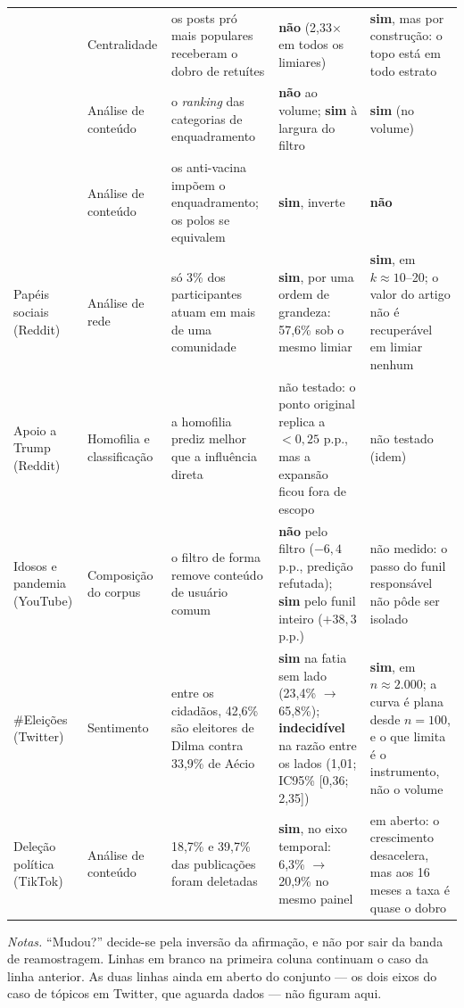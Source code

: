 \begin{table}[p]
\begin{tabularx}{\textwidth}{@{}>{\raggedright\arraybackslash}p{1.75cm}>{\raggedright\arraybackslash}p{2.15cm}X>{\raggedright\arraybackslash}p{2.7cm}>{\raggedright\arraybackslash}p{2.7cm}@{}}
 & Centralidade
 & os posts pró mais populares receberam o dobro de retuítes
 & \textbf{não} (2,33$\times$ em todos os limiares)
 & \textbf{sim}, mas por construção: o topo está em todo estrato \\
\addlinespace[2pt]
 & Análise de conteúdo
 & o \emph{ranking} das categorias de enquadramento
 & \textbf{não} ao volume; \textbf{sim} à largura do filtro
 & \textbf{sim} (no volume) \\
\addlinespace[2pt]
 & Análise de conteúdo
 & os anti-vacina impõem o enquadramento; os polos se equivalem
 & \textbf{sim}, inverte
 & \textbf{não} \\
\midrule
Papéis sociais (Reddit)
 & Análise de rede
 & só 3\% dos participantes atuam em mais de uma comunidade
 & \textbf{sim}, por uma ordem de grandeza: 57,6\% sob o mesmo limiar
 & \textbf{sim}, em $k\approx10$--20; o valor do artigo não é recuperável em limiar nenhum \\
\midrule
Apoio a Trump (Reddit)
 & Homofilia e classificação
 & a homofilia prediz melhor que a influência direta
 & não testado: o ponto original replica a $<0{,}25$ p.p., mas a expansão ficou fora de escopo
 & não testado (idem) \\
\midrule
Idosos e pandemia (YouTube)
 & Composição do corpus
 & o filtro de forma remove conteúdo de usuário comum
 & \textbf{não} pelo filtro ($-6{,}4$ p.p., predição refutada); \textbf{sim} pelo funil inteiro ($+38{,}3$ p.p.)
 & não medido: o passo do funil responsável não pôde ser isolado \\
\midrule
\#Eleições\-2014 (Twitter)
 & Sentimento
 & entre os cidadãos, 42,6\% são eleitores de Dilma contra 33,9\% de Aécio
 & \textbf{sim} na fatia sem lado (23,4\% $\to$ 65,8\%); \textbf{indecidível} na razão entre os lados (1,01; IC95\% [0,36; 2,35])
 & \textbf{sim}, em $n\approx2.000$; a curva é plana desde $n=100$, e o que limita é o instrumento, não o volume \\
\midrule
Deleção política (TikTok)
 & Análise de conteúdo
 & 18,7\% e 39,7\% das publicações foram deletadas
 & \textbf{sim}, no eixo temporal: 6,3\% $\to$ 20,9\% no mesmo painel
 & em aberto: o crescimento desacelera, mas aos 16 meses a taxa é quase o dobro \\
\bottomrule
\end{tabularx}

\vspace{2pt}
{\footnotesize \textit{Notas.} ``Mudou?'' decide-se pela inversão da afirmação, e não
por sair da banda de reamostragem. Linhas em branco na primeira coluna continuam o caso
da linha anterior. As duas linhas ainda em aberto do conjunto --- os dois eixos do caso
de tópicos em Twitter, que aguarda dados --- não figuram aqui.\par}
\end{table}

